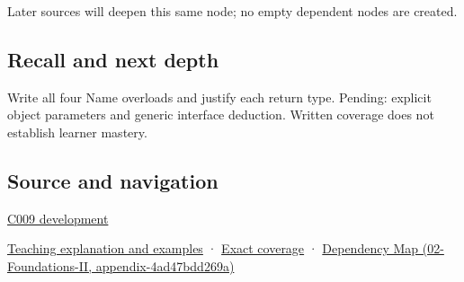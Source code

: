 Later sources will deepen this same node; no empty dependent nodes are created.

\subsection{Recall and next depth}\label{recall-and-next-depth}

Write all four Name overloads and justify each return type. Pending: explicit object parameters and generic interface deduction. Written coverage does not establish learner mastery.

\subsection{Source and navigation}\label{source-and-navigation}

\hyperref[appendix-fd090d982a15]{C009 development}

\href{Continuous\%20Notes/Computing\%20Foundations\%20-\%20From\%20Bits\%20to\%20C++\%20and\%20Systems\%20APIs\#An\%20accessor\%20must\%20respect\%20the\%20caller's\%20lifetime}{Teaching explanation and examples} · \hyperref[appendix-fd090d982a15]{Exact coverage} · \href{}{Dependency Map (02-Foundations-II, appendix-4ad47bdd269a)}
